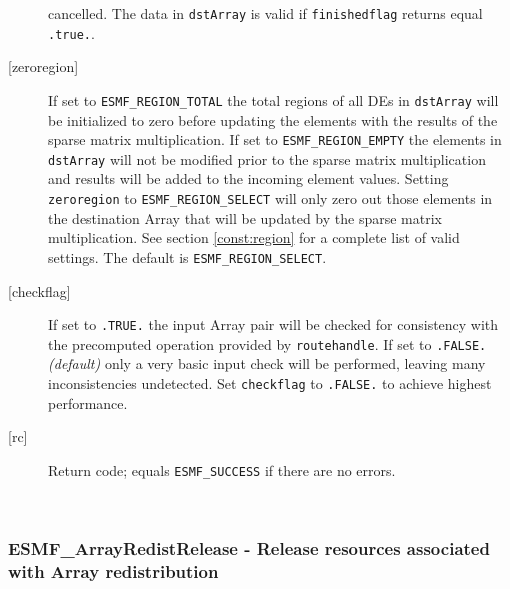 \begin{description}
       cancelled. The data in {\tt dstArray} is valid if {\tt finishedflag} 
       returns equal {\tt .true.}.
     \item [{[zeroregion]}]
       \begin{sloppypar}
       If set to {\tt ESMF\_REGION\_TOTAL} the total regions of
       all DEs in {\tt dstArray} will be initialized to zero before updating the 
       elements with the results of the sparse matrix multiplication. If set to
       {\tt ESMF\_REGION\_EMPTY} the elements in {\tt dstArray} will not be
       modified prior to the sparse matrix multiplication and results will be
       added to the incoming element values. Setting {\tt zeroregion} to 
       {\tt ESMF\_REGION\_SELECT} will only zero out those elements in the 
       destination Array that will be updated by the sparse matrix
       multiplication. See section \ref{const:region} for a complete list of
       valid settings. The default is {\tt ESMF\_REGION\_SELECT}.
       \end{sloppypar}
     \item [{[checkflag]}]
       If set to {\tt .TRUE.} the input Array pair will be checked for
       consistency with the precomputed operation provided by {\tt routehandle}.
       If set to {\tt .FALSE.} {\em (default)} only a very basic input check
       will be performed, leaving many inconsistencies undetected. Set
       {\tt checkflag} to {\tt .FALSE.} to achieve highest performance.
     \item [{[rc]}]
       Return code; equals {\tt ESMF\_SUCCESS} if there are no errors.
     \end{description}
   
 
\mbox{}\hrulefill\ 
 
\subsubsection [ESMF\_ArrayRedistRelease] {ESMF\_ArrayRedistRelease - Release resources associated with Array redistribution}


